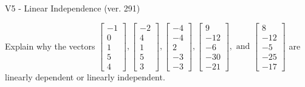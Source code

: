 \begin{exercise}
  \begin{exerciseTitle}V5 - Linear Independence (ver. 291)\end{exerciseTitle}
  \begin{exerciseStatement}
    Explain why the vectors \(\left[\begin{array}{r}
-1 \\
0 \\
1 \\
5 \\
4
\end{array}\right] , \left[\begin{array}{r}
-2 \\
4 \\
1 \\
5 \\
3
\end{array}\right] , \left[\begin{array}{r}
-4 \\
-4 \\
2 \\
-3 \\
-3
\end{array}\right] , \left[\begin{array}{r}
9 \\
-12 \\
-6 \\
-30 \\
-21
\end{array}\right] , \text{ and } \left[\begin{array}{r}
8 \\
-12 \\
-5 \\
-25 \\
-17
\end{array}\right]\) are linearly dependent or linearly independent.	



\end{exerciseStatement}
\end{exercise}
